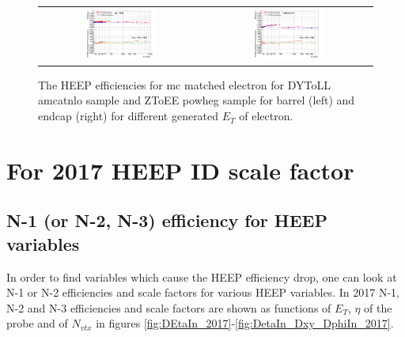 \begin{figure}[bh]
  \begin{center}
    \begin{tabular}{cc}
      \includegraphics[width=0.45\textwidth]{figures/Zprime/2016/ScaleFactor/SameSign/ZToEE_DYToLL_amc/compare_divide_Et_barrel_pass_by_Et_barrel_all.png} &
      \includegraphics[width=0.45\textwidth]{figures/Zprime/2016/ScaleFactor/SameSign/ZToEE_DYToLL_amc/compare_divide_Et_endcap_pass_by_Et_endcap_all.png} \\
    \end{tabular}
    \caption{The HEEP efficiencies for mc matched electron for DYToLL amcatnlo sample and ZToEE powheg sample for barrel (left) and endcap (right) for different generated $E_T$ of electron.}
    \label{fig:eff_ZToEE_DYToLL_amc_ET}
  \end{center}
\end{figure}



\section{For 2017 HEEP ID scale factor}
\label{AppHEEPsf_2017}
\subsection{N-1 (or N-2, N-3) efficiency for HEEP variables}
\label{AppHEEPsf_N_1_2017}

 In order to find variables which cause the HEEP efficiency drop, one can look at N-1 or N-2 efficiencies and scale factors for various HEEP variables.
 In 2017 N-1, N-2 and N-3 efficiencies and scale factors are shown as functions of $E_T$, $\eta$ of the probe and of $N_{vtx}$ in figures \ref{fig:DEtaIn_2017}-\ref{fig:DetaIn_Dxy_DphiIn_2017}.

